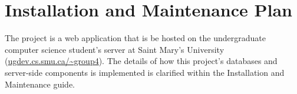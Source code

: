 \documentclass[11pt]{article}
\begin{document}
\section{Installation and Maintenance Plan}

The project is a web application that is be hosted on the undergraduate computer science student's
server at Saint Mary's University (\url{ugdev.cs.smu.ca/~group4}). The details of how this project's
databases and server-side components is implemented is clarified within the Installation and
Maintenance guide.
\end{document}
